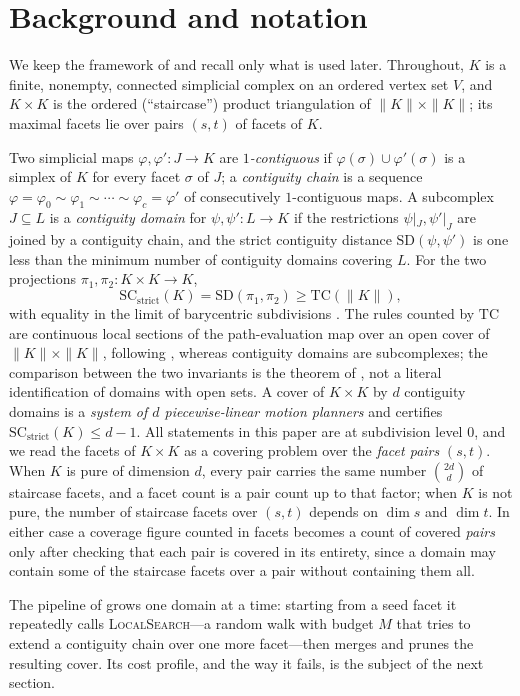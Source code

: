 \documentclass[12pt]{article}
\newcommand{\TC}{\mathrm{TC}}
\newcommand{\SC}{\mathrm{SC}}
\newcommand{\SCst}{\SC_{\mathrm{strict}}}
\newcommand{\SD}{\mathrm{SD}}
\begin{document}
\section{Background and notation}\label{sec:back}

We keep the framework of \cite{OLGB21} and recall only what is used
later.  Throughout, $K$ is a finite, nonempty, connected simplicial complex on an
ordered vertex set $V$, and $K\times K$ is the ordered (``staircase'')
product triangulation of $\|K\|\times\|K\|$; its maximal facets lie
over pairs $(s,t)$ of facets of $K$.

Two simplicial maps $\varphi,\varphi':J\to K$ are \emph{$1$-contiguous}
if $\varphi(\sigma)\cup\varphi'(\sigma)$ is a simplex of $K$ for every
facet $\sigma$ of $J$; a \emph{contiguity chain} is a sequence
$\varphi=\varphi_0\sim\varphi_1\sim\cdots\sim\varphi_c=\varphi'$ of
consecutively $1$-contiguous maps.  A subcomplex $J\subseteq L$ is a
\emph{contiguity domain} for $\psi,\psi':L\to K$ if the restrictions
$\psi|_J,\psi'|_J$ are joined by a contiguity chain, and the strict
contiguity distance $\SD(\psi,\psi')$ is one less than the minimum
number of contiguity domains covering $L$.  For the two projections
$\pi_1,\pi_2:K\times K\to K$,
\[
\SCst(K)=\SD(\pi_1,\pi_2)\ge \TC(\|K\|),
\]
with equality in the limit of barycentric subdivisions
\cite{OLGB21,G18}.  The rules counted by $\TC$ are continuous local
sections of the path-evaluation map over an open cover of
$\|K\|\times\|K\|$, following \cite{F03}, whereas contiguity domains
are subcomplexes; the comparison between the two invariants is the
theorem of \cite{G18}, not a literal identification of domains with
open sets.  A cover of $K\times K$ by $d$ contiguity domains is
a \emph{system of $d$ piecewise-linear motion planners} and certifies
$\SCst(K)\le d-1$.  All statements in this paper are at subdivision
level $0$, and we read the facets of $K\times K$ as a covering problem
over the \emph{facet pairs} $(s,t)$.  When $K$ is pure of dimension
$d$, every pair carries the same number $\binom{2d}{d}$ of staircase
facets, and a facet count is a pair count up to that factor; when $K$
is not pure, the number of staircase facets over $(s,t)$ depends on
$\dim s$ and $\dim t$.  In either case a coverage figure counted in
facets becomes a count of covered \emph{pairs} only after checking
that each pair is covered in its entirety, since a domain may contain
some of the staircase facets over a pair without containing them all.

The pipeline of \cite{OLGB21} grows one domain at a time: starting from
a seed facet it repeatedly calls \textsc{LocalSearch}---a random walk
with budget $M$ that tries to extend a contiguity chain over one more
facet---then merges and prunes the resulting cover.  Its cost profile,
and the way it fails, is the subject of the next section.
\end{document}
